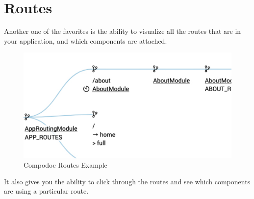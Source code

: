 \section{Routes}
Another one of the favorites is the ability to visualize all the routes that are in your application, and which components are attached. 

\begin{figure}[h!]
\caption{Compodoc Routes Example}
\includegraphics[width=414pt]{graphics/compodoc/routes/compodoc-routes.pdf}
\end{figure}

It also gives you the ability to click through the routes and see which components are using a particular route.